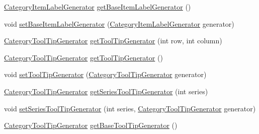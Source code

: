 \begin{DoxyCompactItemize}
\item 
\mbox{\hyperlink{interfaceorg_1_1jfree_1_1chart_1_1labels_1_1_category_item_label_generator}{Category\+Item\+Label\+Generator}} \mbox{\hyperlink{interfaceorg_1_1jfree_1_1chart_1_1renderer_1_1category_1_1_category_item_renderer_aa30e54bde9b1b02438519b9d11644ec4}{get\+Base\+Item\+Label\+Generator}} ()
\item 
void \mbox{\hyperlink{interfaceorg_1_1jfree_1_1chart_1_1renderer_1_1category_1_1_category_item_renderer_aa4ca7bd2b2d702c879718fece021d3a4}{set\+Base\+Item\+Label\+Generator}} (\mbox{\hyperlink{interfaceorg_1_1jfree_1_1chart_1_1labels_1_1_category_item_label_generator}{Category\+Item\+Label\+Generator}} generator)
\item 
\mbox{\hyperlink{interfaceorg_1_1jfree_1_1chart_1_1labels_1_1_category_tool_tip_generator}{Category\+Tool\+Tip\+Generator}} \mbox{\hyperlink{interfaceorg_1_1jfree_1_1chart_1_1renderer_1_1category_1_1_category_item_renderer_aaadd626509dd8276e4704cb1d88a74ea}{get\+Tool\+Tip\+Generator}} (int row, int column)
\item 
\mbox{\hyperlink{interfaceorg_1_1jfree_1_1chart_1_1labels_1_1_category_tool_tip_generator}{Category\+Tool\+Tip\+Generator}} \mbox{\hyperlink{interfaceorg_1_1jfree_1_1chart_1_1renderer_1_1category_1_1_category_item_renderer_a887b874ffbaafb55216058196012b320}{get\+Tool\+Tip\+Generator}} ()
\item 
void \mbox{\hyperlink{interfaceorg_1_1jfree_1_1chart_1_1renderer_1_1category_1_1_category_item_renderer_a50195768240d15b1a334a49d66aff2e8}{set\+Tool\+Tip\+Generator}} (\mbox{\hyperlink{interfaceorg_1_1jfree_1_1chart_1_1labels_1_1_category_tool_tip_generator}{Category\+Tool\+Tip\+Generator}} generator)
\item 
\mbox{\hyperlink{interfaceorg_1_1jfree_1_1chart_1_1labels_1_1_category_tool_tip_generator}{Category\+Tool\+Tip\+Generator}} \mbox{\hyperlink{interfaceorg_1_1jfree_1_1chart_1_1renderer_1_1category_1_1_category_item_renderer_a9266001456365d0bfa851db45a7c281f}{get\+Series\+Tool\+Tip\+Generator}} (int series)
\item 
void \mbox{\hyperlink{interfaceorg_1_1jfree_1_1chart_1_1renderer_1_1category_1_1_category_item_renderer_a5015519bf531ff5a7f4e165c84f192cb}{set\+Series\+Tool\+Tip\+Generator}} (int series, \mbox{\hyperlink{interfaceorg_1_1jfree_1_1chart_1_1labels_1_1_category_tool_tip_generator}{Category\+Tool\+Tip\+Generator}} generator)
\item 
\mbox{\hyperlink{interfaceorg_1_1jfree_1_1chart_1_1labels_1_1_category_tool_tip_generator}{Category\+Tool\+Tip\+Generator}} \mbox{\hyperlink{interfaceorg_1_1jfree_1_1chart_1_1renderer_1_1category_1_1_category_item_renderer_a7645a46ca7fd406133337313e00154aa}{get\+Base\+Tool\+Tip\+Generator}} ()

\end{DoxyCompactItemize}
